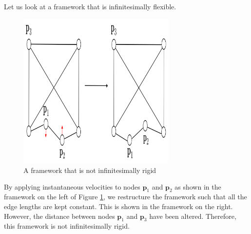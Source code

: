 \begin{example}
Let us look at a framework that is infinitesimally flexible.
\begin{figure}[htbp]
    \centering
    \includegraphics[width = 0.7\textwidth]{Chapter 2/10. not_inf_rigid_2.0.png}
    \caption{A framework that is not infinitesimally rigid}
    \label{eg: not inf rigid 2.0}
\end{figure}

\begin{flushleft}
By applying instantaneous velocities to nodes $\textbf{p}_1$ and $\textbf{p}_2$ as shown in the framework on the left of Figure \ref{eg: not inf rigid 2.0}, we restructure the framework such that all the edge lengths are kept constant. This is shown in the framework on the right. However, the distance between nodes $\textbf{p}_1$ and $\textbf{p}_3$ have been altered. Therefore, this framework is not infinitesimally rigid.
\end{flushleft}
     

\end{example}
